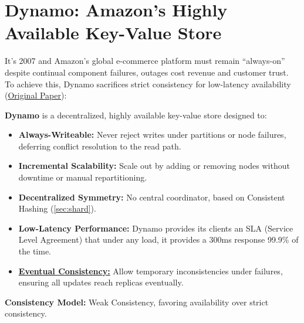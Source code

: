 \newpage

\section{Dynamo: Amazon's Highly Available Key-Value Store}

It's 2007 and Amazon's global e-commerce platform must remain ``always-on'' despite continual component failures, outages cost 
revenue and customer trust. To achieve this, Dynamo sacrifices strict consistency for low-latency availability (\href{https://www.amazon.science/publications/dynamo-amazons-highly-available-key-value-store#:~:text=This%20paper%20presents%20the%20design%20and%20implementation%20of,availability%2C%20Dynamo%20sacrifices%20consistency%20under%20certain%20failure%20scenarios.}{Original Paper}):

\begin{Def}
    \textbf{Dynamo} is a decentralized, highly available key-value store designed to:
    \begin{itemize}
      \item \textbf{Always-Writeable:} Never reject writes under partitions or node failures, deferring conflict resolution to the read path.
      \item \textbf{Incremental Scalability:} Scale out by adding or removing nodes without downtime or manual repartitioning.
      \item \textbf{Decentralized Symmetry:} No central coordinator, based on Consistent Hashing (\ref{sec:shard}).
      \item \textbf{Low-Latency Performance:} Dynamo provides its clients an SLA (Service Level Agreement) that under any load, it provides 
      a 300ms response 99.9\% of the time.
      \item \underline{\textbf{Eventual Consistency:}} Allow temporary inconsistencies under failures, ensuring all updates reach replicas eventually.
    \end{itemize}
    \noindent
    \textbf{Consistency Model:} Weak Consistency, favoring availability over strict consistency.
  \end{Def}
  
